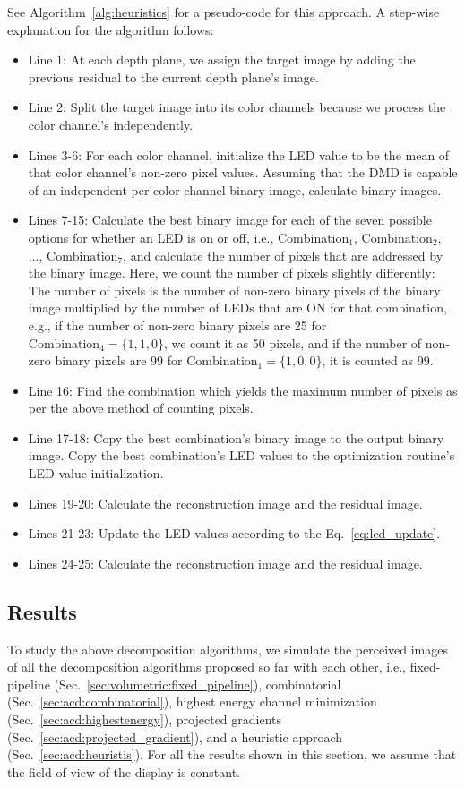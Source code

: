 

See Algorithm~\ref{alg:heuristics} for a pseudo-code for this approach. A step-wise explanation for the algorithm follows:
\begin{itemize}
    \item Line 1: At each depth plane, we assign the target image by adding the previous residual to the current depth plane's image. 
    \item Line 2: Split the target image into its color channels because we process the color channel's independently.
    \item Lines 3-6: For each color channel, initialize the LED value to be the mean of that color channel's non-zero pixel values. Assuming that the DMD is capable of an independent per-color-channel binary image, calculate binary images.
    \item Lines 7-15: Calculate the best binary image for each of the seven possible options for whether an LED is on or off, i.e., $\text{Combination}_1$, $\text{Combination}_2$, ..., $\text{Combination}_7$, and calculate the number of pixels that are addressed by the binary image. Here, we count the number of pixels slightly differently: The number of pixels is the number of non-zero binary pixels of the binary image multiplied by the number of LEDs that are ON for that combination, e.g., if the number of non-zero binary pixels are 25 for $\text{Combination}_4 = \{1,1,0\}$, we count it as 50 pixels, and if the number of non-zero binary pixels are 99 for $\text{Combination}_1=\{1,0,0\}$, it is counted as 99. 
    \item Line 16: Find the combination which yields the maximum number of pixels as per the above method of counting pixels. 
    \item Line 17-18: Copy the best combination's binary image to the output binary image. Copy the best combination's LED values to the optimization routine's LED value initialization.
    \item Lines 19-20: Calculate the reconstruction image and the residual image.
    \item Lines 21-23: Update the LED values according to the Eq.~\ref{eq:led_update}.
    \item Lines 24-25: Calculate the reconstruction image and the residual image.
\end{itemize}


\subsection{Results}
\label{sec:volumetric:acd:results}
To study the above decomposition algorithms, we simulate the perceived images of all the decomposition algorithms proposed so far with each other, i.e., fixed-pipeline (Sec.~\ref{sec:volumetric:fixed_pipeline}), combinatorial (Sec.~\ref{sec:acd:combinatorial}), highest energy channel minimization (Sec.~\ref{sec:acd:highestenergy}), projected gradients (Sec.~\ref{sec:acd:projected_gradient}), and a heuristic approach (Sec.~\ref{sec:acd:heuristis}). For all the results shown in this section, we assume that the field-of-view of the display is constant. 

